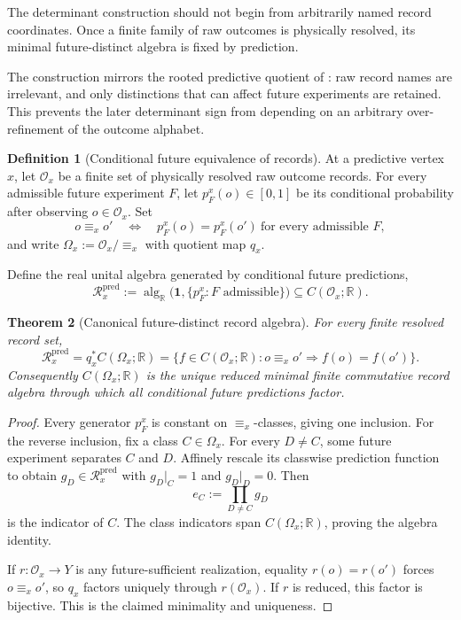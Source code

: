 \documentclass[11pt]{article}
\newtheorem{theorem}{Theorem}[section]
\theoremstyle{definition}
\newtheorem{definition}[theorem]{Definition}
\theoremstyle{remark}
\newcommand{\R}{\mathbb R}
\newcommand{\one}{\mathbf 1}
\newcommand{\Rr}{\mathcal R}
\newcommand{\pred}{\mathrm{pred}}
\begin{document}
The determinant construction should not begin from arbitrarily named record
coordinates.  Once a finite family of raw outcomes is physically resolved,
its minimal future-distinct algebra is fixed by prediction.

The construction mirrors the rooted predictive quotient of
: raw record names are irrelevant, and only distinctions that
can affect future experiments are retained.  This prevents the later determinant
sign from depending on an arbitrary over-refinement of the outcome alphabet.

\begin{definition}[Conditional future equivalence of records]
\label{def:record-future-equivalence}
At a predictive vertex $x$, let $\mathcal O_x$ be a finite set of physically
resolved raw outcome records.  For every admissible future experiment $F$, let
$p_F^x(o)\in[0,1]$ be its conditional probability after observing
$o\in\mathcal O_x$.  Set
\[
 o\equiv_x o'
 \quad\Longleftrightarrow\quad
 p_F^x(o)=p_F^x(o')\ \text{for every admissible }F,
\]
and write $\Omega_x:=\mathcal O_x/{\equiv_x}$ with quotient map $q_x$.
\end{definition}

Define the real unital algebra generated by conditional future predictions,
\[
 \Rr_x^{\pred}:=
 \operatorname{alg}_{\R}\bigl(\one,\{p_F^x:F\text{ admissible}\}\bigr)
 \subseteq C(\mathcal O_x;\R).
\]

\begin{theorem}[Canonical future-distinct record algebra]
\label{thm:canonical-record-algebra}
For every finite resolved record set,
\[
 \boxed{
 \Rr_x^{\pred}=q_x^*C(\Omega_x;\R)
 =\{f\in C(\mathcal O_x;\R):
      o\equiv_x o'\Rightarrow f(o)=f(o')\}.}
\]
Consequently $C(\Omega_x;\R)$ is the unique reduced minimal finite
commutative record algebra through which all conditional future predictions
factor.
\end{theorem}

\begin{proof}
Every generator $p_F^x$ is constant on $\equiv_x$-classes, giving one
inclusion.  For the reverse inclusion, fix a class $C\in\Omega_x$.  For every
$D\ne C$, some future experiment separates $C$ and $D$.  Affinely rescale its
classwise prediction function to obtain $g_D\in\Rr_x^{\pred}$ with
$g_D|_C=1$ and $g_D|_D=0$.  Then
\[
 e_C:=\prod_{D\ne C}g_D
\]
is the indicator of $C$.  The class indicators span $C(\Omega_x;\R)$, proving
the algebra identity.

If $r:\mathcal O_x\to Y$ is any future-sufficient realization, equality
$r(o)=r(o')$ forces $o\equiv_x o'$, so $q_x$ factors uniquely through
$r(\mathcal O_x)$.  If $r$ is reduced, this factor is bijective.  This is the
claimed minimality and uniqueness.
\end{proof}
\end{document}
